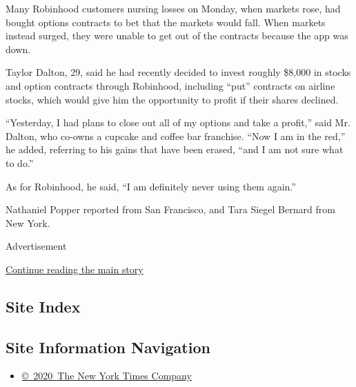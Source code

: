 Many Robinhood customers nursing losses on Monday, when markets rose,
had bought options contracts to bet that the markets would fall. When
markets instead surged, they were unable to get out of the contracts
because the app was down.

Taylor Dalton, 29, said he had recently decided to invest roughly
\$8,000 in stocks and option contracts through Robinhood, including
``put'' contracts on airline stocks, which would give him the
opportunity to profit if their shares declined.

``Yesterday, I had plans to close out all of my options and take a
profit,'' said Mr. Dalton, who co-owns a cupcake and coffee bar
franchise. ``Now I am in the red,'' he added, referring to his gains
that have been erased, ``and I am not sure what to do.''

As for Robinhood, he said, ``I am definitely never using them again.''

Nathaniel Popper reported from San Francisco, and Tara Siegel Bernard
from New York.

Advertisement

\protect\hyperlink{after-bottom}{Continue reading the main story}

\hypertarget{site-index}{%
\subsection{Site Index}\label{site-index}}

\hypertarget{site-information-navigation}{%
\subsection{Site Information
Navigation}\label{site-information-navigation}}

\begin{itemize}
\tightlist
\item
  \href{https://help.nytimes3xbfgragh.onion/hc/en-us/articles/115014792127-Copyright-notice}{©~2020~The
  New York Times Company}
\end{itemize}

